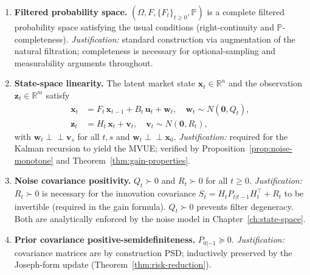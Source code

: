 \documentclass[12pt,openany]{book}
\numberwithin{equation}{chapter}
\theoremstyle{plain}
\theoremstyle{definition}
\theoremstyle{remark}
\def\mathcal#1{#1}%
\begin{document}
\begin{enumerate}

  \item \textbf{Filtered probability space.}
        $(\Omega,\mathcal{F},\{\mathcal{F}_t\}_{t\ge0},\mathbb{P})$
        is a complete filtered probability space satisfying the usual
        conditions (right-continuity and $\mathbb{P}$-completeness).
        \emph{Justification:} standard construction via augmentation
        of the natural filtration; completeness is necessary for
        optional-sampling and measurability arguments throughout.

  \item \textbf{State-space linearity.}
        The latent market state $\mathbf{x}_t\in\mathbb{R}^n$ and the
        observation $\mathbf{z}_t\in\mathbb{R}^m$ satisfy
        \begin{align}
          \mathbf{x}_{t} &= F_t\,\mathbf{x}_{t-1}
                            + B_t\,\mathbf{u}_t
                            + \mathbf{w}_t,
                            \quad \mathbf{w}_t \sim
                            \mathcal{N}(\mathbf{0},Q_t),
                            \label{eq:ss-process} \\
          \mathbf{z}_{t} &= H_t\,\mathbf{x}_t
                            + \mathbf{v}_t,
                            \quad \mathbf{v}_t \sim
                            \mathcal{N}(\mathbf{0},R_t),
                            \label{eq:ss-obs}
        \end{align}
        with $\mathbf{w}_t \perp\!\!\!\perp \mathbf{v}_s$ for all
        $t,s$ and $\mathbf{w}_t \perp\!\!\!\perp \mathbf{x}_0$.
        \emph{Justification:} required for the Kalman recursion to
        yield the MVUE; verified by Proposition~\ref{prop:noise-monotone}
        and Theorem~\ref{thm:gain-properties}.

  \item \textbf{Noise covariance positivity.}
        $Q_t \succ 0$ and $R_t \succ 0$ for all $t \ge 0$.
        \emph{Justification:} $R_t \succ 0$ is necessary for the
        innovation covariance $S_t = H_t P_{t|t-1} H_t^\top + R_t$
        to be invertible (required in the gain formula).  $Q_t \succ 0$
        prevents filter degeneracy.  Both are analytically enforced by
        the noise model in Chapter~\ref{ch:state-space}.

  \item \textbf{Prior covariance positive-semidefiniteness.}
        $P_{0|{-1}} \succeq 0$.
        \emph{Justification:} covariance matrices are by construction
        PSD; inductively preserved by the Joseph-form update
        (Theorem~\ref{thm:risk-reduction}).


\end{enumerate}
\end{document}
